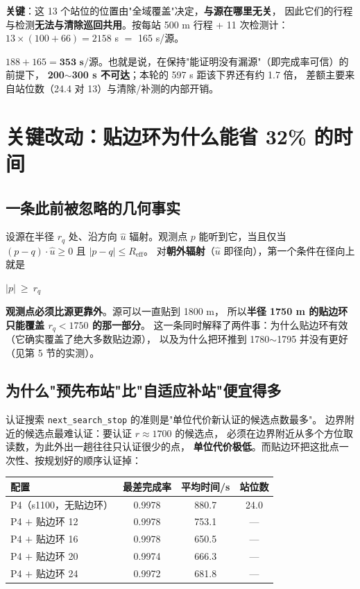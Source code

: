 \textbf{关键}：这 13 个站位的位置由"全域覆盖"决定，\textbf{与源在哪里无关}，
因此它们的行程与检测\textbf{无法与清除巡回共用}。按每站 500 m 行程 + 11 次检测计：
$13\times(100+66)=2158$ s $=$ 165 s/源。

\begin{keybox}[title=下界结论]
$188+165=\textbf{353 s/源}$。也就是说，在保持"能证明没有漏源"（即完成率可信）的前提下，
\textbf{200$\sim$300 s 不可达}；本轮的 597 s 距该下界还有约 1.7 倍，
差额主要来自站位数（24.4 对 13）与清除/补测的内部开销。
\end{keybox}

\section{关键改动：贴边环为什么能省 32\% 的时间}

\subsection{一条此前被忽略的几何事实}

设源在半径 $r_q$ 处、沿方向 $\hat u$ 辐射。观测点 $p$ 能听到它，当且仅当
$(p-q)\cdot\hat u\ge0$ 且 $|p-q|\le R_{\text{eff}}$。
对\textbf{朝外辐射}（$\hat u$ 即径向），第一个条件在径向上就是

\begin{center}
$|p|\ \ge\ r_q$
\end{center}

\textbf{观测点必须比源更靠外}。源可以一直贴到 1800 m，
所以\textbf{半径 1750 m 的贴边环只能覆盖 $r_q<1750$ 的那一部分}。
这一条同时解释了两件事：为什么贴边环有效（它确实覆盖了绝大多数贴边源），
以及为什么把环推到 1780$\sim$1795 并没有更好（见第 5 节的实测）。

\subsection{为什么"预先布站"比"自适应补站"便宜得多}

认证搜索 \texttt{next\_search\_stop} 的准则是"单位代价新认证的候选点数最多"。
边界附近的候选点最难认证：要认证 $r\approx1700$ 的候选点，
必须在边界附近从多个方位取读数，为此外出一趟往往只认证很少的点，
\textbf{单位代价极低}。而贴边环把这批点一次性、按规划好的顺序认证掉：

\begin{center}
\begin{tabular}{lccc}
\toprule
配置 & 最差完成率 & 平均时间/s & 站位数 \\ \midrule
P4（s1100，无贴边环） & 0.9978 & 880.7 & 24.0 \\
P4 $+$ 贴边环 12 & 0.9978 & 753.1 & --- \\
P4 $+$ 贴边环 16 & 0.9978 & 650.5 & --- \\
P4 $+$ 贴边环 20 & 0.9974 & 666.3 & --- \\
P4 $+$ 贴边环 24 & 0.9972 & 681.8 & --- \\
\bottomrule
\end{tabular}
\end{center}

